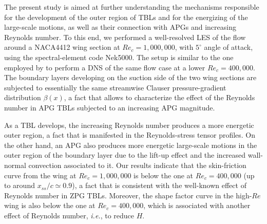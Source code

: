 The present study is aimed at further understanding the mechanisms responsible for the development of the outer region of TBLs and for the energizing of the large-scale motions, as well as their connection with APGs and increasing Reynolds number. To this end, we performed a well-resolved LES of the flow around a NACA4412 wing section at $Re_{c}=1,000,000$, with $5^{\circ}$ angle of attack, using the spectral-element code Nek5000. The setup is similar to the one employed by \cite{hosseini_et_al} to perform a DNS of the same flow case at a lower $Re_{c}=400,000$. The boundary layers developing on the suction side of the two wing sections are subjected to essentially the same streamwise Clauser pressure-gradient distribution $\beta(x)$, a fact that allows to characterize the effect of the Reynolds number in APG TBLs subjected to an increasing APG magnitude. 

As a TBL develops, the increasing Reynolds number produces a more energetic outer region, a fact that is manifested in the Reynolds-stress tensor profiles. On the other hand, an APG also produces more energetic large-scale motions in the outer region of the boundary layer due to the lift-up effect and the increased wall-normal convection associated to it. Our results indicate that the skin-friction curve from the wing at $Re_{c}=1,000,000$ is below the one at $Re_{c}=400,000$ (up to around $x_{ss}/c \simeq 0.9$), a fact that is consistent with the well-known effect of Reynolds number in ZPG TBLs. Moreover, the shape factor curve in the high-$Re$ wing is also below the one at $Re_{c}=400,000$, which is associated with another effect of Reynolds number, {\it i.e.}, to reduce $H$. 

